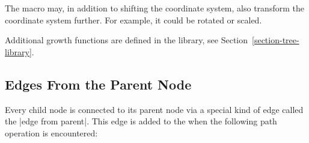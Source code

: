 \begin{itemize}
  The macro may, in addition to shifting the coordinate system, also
  transform the coordinate system further. For example, it could be
  rotated or scaled.

  Additional growth functions are defined in the library, see 
  Section~\ref{section-tree-library}.
\end{itemize}



\subsection{Edges From the Parent Node}

\label{section-edge-from-parent}

Every child node is connected to its parent node via a special kind of
edge called the |edge from parent|. This edge is added to the
 when the following path operation is encountered:

